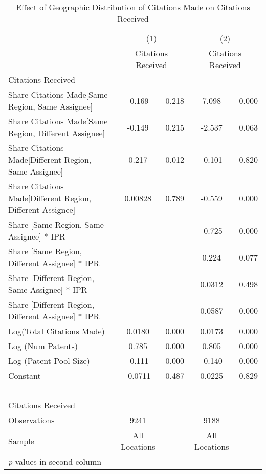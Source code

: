 {
\begin{longtable}{l*{2}{cc}}
\caption{Effect of Geographic Distribution of Citations Made on Citations Received \label{model14}}\\
\hline\hline\endfirsthead\hline\endhead\hline\endfoot\endlastfoot
                &\multicolumn{2}{c}{(1)}&\multicolumn{2}{c}{(2)}\\
                &\multicolumn{2}{c}{Citations Received}&\multicolumn{2}{c}{Citations Received}\\
\hline
Citations Received&         &         &         &         \\
Share Citations Made[Same Region, Same Assignee]&   -0.169&    0.218&    7.098&    0.000\\
Share Citations Made[Same Region, Different Assignee]&   -0.149&    0.215&   -2.537&    0.063\\
Share Citations Made[Different Region, Same Assignee]&    0.217&    0.012&   -0.101&    0.820\\
Share Citations Made[Different Region, Different Assignee]&  0.00828&    0.789&   -0.559&    0.000\\
Share [Same Region, Same Assignee] * IPR&         &         &   -0.725&    0.000\\
Share [Same Region, Different Assignee] * IPR&         &         &    0.224&    0.077\\
Share [Different Region, Same Assignee] * IPR&         &         &   0.0312&    0.498\\
Share [Different Region, Different Assignee] * IPR&         &         &   0.0587&    0.000\\
Log(Total Citations Made)&   0.0180&    0.000&   0.0173&    0.000\\
Log (Num Patents)&    0.785&    0.000&    0.805&    0.000\\
Log (Patent Pool Size)&   -0.111&    0.000&   -0.140&    0.000\\
Constant        &  -0.0711&    0.487&   0.0225&    0.829\\
\hline
\_               &         &         &         &         \\
Citations Received&         &         &         &         \\
\hline
Observations    &     9241&         &     9188&         \\
Sample          &All Locations&         &All Locations&         \\
\hline\hline
\multicolumn{5}{l}{\footnotesize \textit{p}-values in second column}\\
\end{longtable}
}
